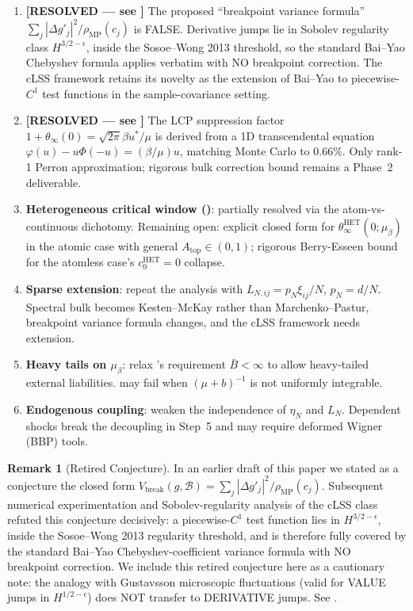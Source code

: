 \documentclass[11pt,a4paper]{article}
\theoremstyle{definition}
\newtheorem{remark}[theorem]{Remark}
\newcommand{\Vbreak}{V_{\mathrm{break}}}
\newcommand{\rhoMP}{\rho_{\mathrm{MP}}}
\newcommand{\Bcal}{\mathcal{B}}
\newcommand{\HET}{\mathrm{HET}}
\begin{document}
\begin{enumerate}[leftmargin=1.5em]
\item \textbf{[RESOLVED --- see ]} The proposed ``breakpoint
  variance formula'' $\sum_j|\Delta g'_j|^2/\rhoMP(c_j)$ is FALSE. Derivative
  jumps lie in Sobolev regularity class $H^{3/2-\epsilon}$, inside the
  Sosoe--Wong 2013 threshold, so the standard Bai--Yao Chebyshev formula
  applies verbatim with NO breakpoint correction. The cLSS framework retains
  its novelty as the extension of Bai--Yao to piecewise-$C^1$ test functions
  in the sample-covariance setting.
\item \textbf{[RESOLVED --- see ]} The LCP suppression
  factor $1+\theta_\infty(0) = \sqrt{2\pi}\beta u^\ast/\mu$ is
  derived from a 1D transcendental equation $\varphi(u)-u\Phi(-u) = (\beta/\mu)u$,
  matching Monte Carlo to $0.66\%$. Only rank-1 Perron approximation;
  rigorous bulk correction bound remains a Phase~2 deliverable.
\item \textbf{Heterogeneous critical window ()}:
  partially resolved via the atom-vs-continuous dichotomy. Remaining open:
  explicit closed form for $\theta_\infty^{\HET}(0;\mu_\beta)$ in the atomic
  case with general $A_{\text{top}}\in(0,1)$; rigorous Berry-Esseen bound for
  the atomless case's $c_0^{\HET} = 0$ collapse.
\item \textbf{Sparse extension}: repeat the analysis with
  $L_{N,ij} = p_N\xi_{ij}/N$, $p_N = d/N$. Spectral bulk becomes Kesten--McKay
  rather than Marchenko--Pastur, breakpoint variance formula changes, and
  the cLSS framework needs extension.
\item \textbf{Heavy tails on $\mu_\beta$}: relax 's requirement
  $\bar B<\infty$ to allow heavy-tailed external liabilities.
   may fail when $(\mu+b)^{-1}$ is not uniformly
  integrable.
\item \textbf{Endogenous coupling}: weaken the independence of $\eta_N$ and
  $L_N$. Dependent shocks break the decoupling in  Step~5
  and may require deformed Wigner (BBP) tools.
\end{enumerate}

\begin{remark}[Retired Conjecture]
\label{conj:Vbreak-explicit}
In an earlier draft of this paper we stated as a conjecture the closed form
$\Vbreak(g,\Bcal) = \sum_j|\Delta g'_j|^2/\rhoMP(c_j)$. Subsequent numerical
experimentation and Sobolev-regularity analysis of the cLSS class refuted
this conjecture decisively: a piecewise-$C^1$ test function lies in
$H^{3/2-\epsilon}$, inside the Sosoe--Wong 2013 regularity threshold, and
is therefore fully covered by the standard Bai--Yao Chebyshev-coefficient
variance formula with NO breakpoint correction. We include this retired
conjecture here as a cautionary note: the analogy with Gustavsson
microscopic fluctuations (valid for VALUE jumps in $H^{1/2-\epsilon}$) does
NOT transfer to DERIVATIVE jumps. See .
\end{remark}
\end{document}
